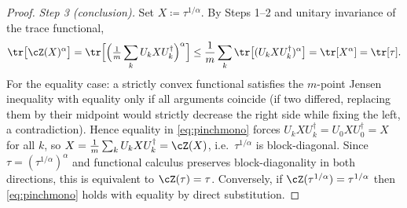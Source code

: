 \begin{proof}
\emph{Step 3 (conclusion).} Set $X\coloneqq\tau^{1/\alpha}$. By Steps 1--2
and unitary invariance of the trace functional,
\begin{equation*}
  \tr\big[\cZ(X)^{\alpha}\big]
  =\tr\Big[\Big(\tfrac1m\sum_kU_kXU_k^{\dagger}\Big)^{\alpha}\Big]
  \le\frac1m\sum_k\tr\big[(U_kXU_k^{\dagger})^{\alpha}\big]
  =\tr[X^{\alpha}]=\tr[\tau].
\end{equation*}
For the equality case: a strictly convex functional satisfies the
$m$-point Jensen inequality with equality only if all arguments coincide
(if two differed, replacing them by their midpoint would strictly decrease
the right side while fixing the left, a contradiction). Hence equality in
\eqref{eq:pinchmono} forces $U_kXU_k^{\dagger}=U_0XU_0^{\dagger}=X$ for all
$k$, so $X=\frac1m\sum_kU_kXU_k^{\dagger}=\cZ(X)$, i.e.\
$\tau^{1/\alpha}$ is block-diagonal. Since $\tau=(\tau^{1/\alpha})^{\alpha}$
and functional calculus preserves block-diagonality in both directions,
this is equivalent to $\cZ(\tau)=\tau$. Conversely, if
$\cZ(\tau^{1/\alpha})=\tau^{1/\alpha}$ then
\eqref{eq:pinchmono} holds with equality by direct substitution.
\end{proof}
